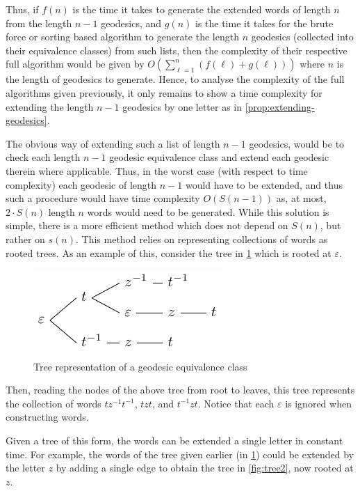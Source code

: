 Thus, if $f(n)$ is the time it takes to generate the extended words of length $n$ from the length $n-1$ geodesics, and $g(n)$ is the time it takes for the brute force or sorting based algorithm to generate the length $n$ geodesics (collected into their equivalence classes) from such lists, then the complexity of their respective full algorithm would be given by $ O(\sum_{\ell=1}^n (f(\ell)+g(\ell))) $ where $n$ is the length of geodesics to generate.
Hence, to analyse the complexity of the full algorithms given previously, it only remains to show a time complexity for extending the length $n-1$ geodesics by one letter as in \cref{prop:extending-geodesics}.

The obvious way of extending such a list of length $n-1$ geodesics, would be to check each length $n-1$ geodesic equivalence class and extend each geodesic therein where applicable.
Thus, in the worst case (with respect to time complexity) each geodesic of length $n-1$ would have to be extended, and thus such a procedure would have time complexity $O(S(n-1))$ as, at most, $2 \cdot S(n)$ length $n$ words would need to be generated.
While this solution is simple, there is a more efficient method which does not depend on $S(n)$, but rather on $s(n)$.
This method relies on representing collections of words as rooted trees.
As an example of this, consider the  tree in \cref{fig:tree1} which is rooted at $\varepsilon$.

\begin{figure}[!ht]
	\centering

	\includegraphics{figures/geodesicGenerating/treeRep}

	\caption{Tree representation of a geodesic equivalence class}
	\label{fig:tree1}
\end{figure}


Then, reading the nodes of the above tree from root to leaves, this tree represents the collection of words $tz^{-1}t^{-1}$, $tzt$, and $t^{-1}z t$.
Notice that each $\varepsilon$ is ignored when constructing words.

Given a tree of this form, the words can be extended a single letter in constant time.
For example, the words of the tree given earlier (in \cref{fig:tree1}) could be extended by the letter $z$ by adding a single edge to obtain the  tree in \cref{fig:tree2}, now rooted at $z$.

